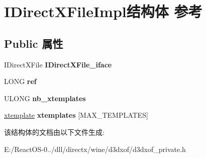 \hypertarget{struct_i_direct_x_file_impl}{}\section{I\+Direct\+X\+File\+Impl结构体 参考}
\label{struct_i_direct_x_file_impl}
\subsection*{Public 属性}
\begin{DoxyCompactItemize}
\item 
\mbox{\label{struct_i_direct_x_file_impl_aa5885f504840a9c215dfd8052288a2a8}} 
I\+Direct\+X\+File {\bfseries I\+Direct\+X\+File\+\_\+iface}
\item 
\mbox{\label{struct_i_direct_x_file_impl_a42423ecc3b998524303bf39af2da48ab}} 
L\+O\+NG {\bfseries ref}
\item 
\mbox{\label{struct_i_direct_x_file_impl_ae92bc20a05826406cdb2c90c2f828a61}} 
U\+L\+O\+NG {\bfseries nb\+\_\+xtemplates}
\item 
\mbox{\label{struct_i_direct_x_file_impl_ac8608afcce6b0fb4a5674c9394ac8dcc}} 
\hyperlink{structxtemplate}{xtemplate} {\bfseries xtemplates} \mbox{[}M\+A\+X\+\_\+\+T\+E\+M\+P\+L\+A\+T\+ES\mbox{]}
\end{DoxyCompactItemize}


该结构体的文档由以下文件生成\+:\begin{DoxyCompactItemize}
\item 
E\+:/\+React\+O\+S-\/0../dll/directx/wine/d3dxof/d3dxof\+\_\+private.\+h\end{DoxyCompactItemize}
